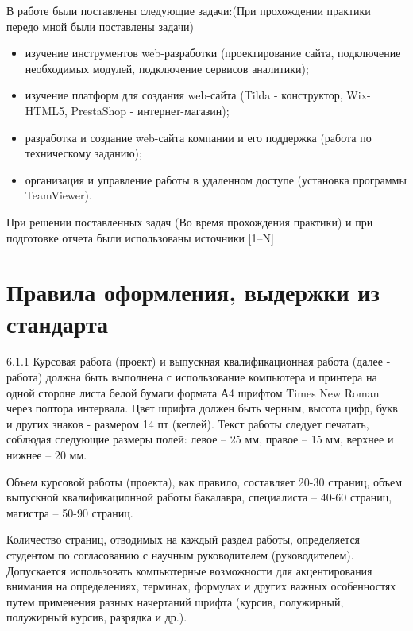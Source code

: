 \documentclass[bachelor, och, coursework]{SCWorks}
\begin{document}
В работе были поставлены следующие задачи:(При прохождении практики передо мной были поставлены задачи)
\begin{itemize}
  \item изучение инструментов web-разработки (проектирование сайта, подключение необходимых модулей, подключение сервисов аналитики);
  \item изучение платформ для создания web-сайта (Tilda - конструктор, Wix- HTML5, PrestaShop - интернет-магазин);
  \item разработка и создание web-сайта компании и его поддержка (работа по техническому заданию);
  \item организация и управление работы в удаленном доступе (установка программы TeamViewer).
\end{itemize}

При решении поставленных задач (Во время прохождения практики) и при подготовке отчета были использованы источники [1--N]



\section{Правила оформления, выдержки из стандарта}

6.1.1 Курсовая работа (проект) и выпускная квалификационная работа (далее - работа) должна быть выполнена с использование компьютера и принтера на
одной стороне листа белой бумаги формата А4 шрифтом Times New Roman через
полтора интервала.
Цвет шрифта должен быть черным, высота цифр, букв и других знаков -
размером 14 пт (кеглей).
Текст работы следует печатать, соблюдая следующие размеры полей: левое
– 25 мм, правое – 15 мм, верхнее и нижнее – 20 мм.

Объем курсовой работы (проекта), как правило, составляет 20-30 страниц,
объем выпускной квалификационной работы бакалавра, специалиста – 40-60
страниц, магистра – 50-90 страниц.

Количество страниц, отводимых на каждый раздел работы, определяется
студентом по согласованию с научным руководителем (руководителем).
Допускается использовать компьютерные возможности для акцентирования
внимания на определениях, терминах, формулах и других важных особенностях
путем применения разных начертаний шрифта (курсив, полужирный, полужирный
курсив, разрядка и др.).
\end{document}
